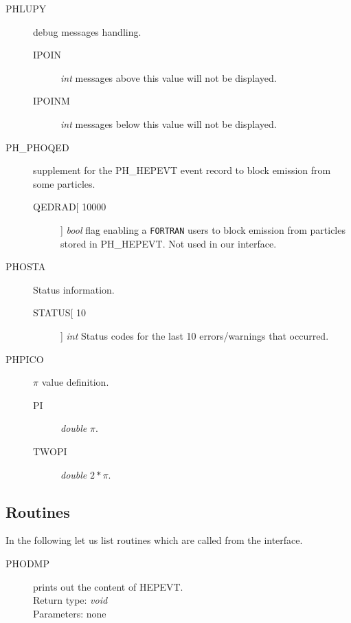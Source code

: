 \documentclass[]{Photos_interface_design}
\begin{document}
\begin{description}
\item[PHLUPY] debug messages handling.
    \begin{description}
    \item[IPOIN]  \textit{int} messages above this value will not be displayed.
	\item[IPOINM] \textit{int} messages below this value will not be displayed.
    \end{description}
\end{description}

\begin{description}
\item[PH\_PHOQED] supplement for the PH\_HEPEVT event record to block emission 
from some particles.
    \begin{description}
    \item[QEDRAD[ 10000]]  \textit{bool} flag enabling a {\tt FORTRAN} users
    to block emission from particles stored in PH\_HEPEVT. Not used in 
     our interface.
    \end{description}
\end{description}

\begin{description}
\item[PHOSTA] Status information.
    \begin{description}
    \item[STATUS[ 10]]  \textit{int} Status codes for the last 10 errors/warnings
    that occurred.
    \end{description}
\end{description}

\begin{description}
\item[PHPICO] $\pi$ value definition.
    \begin{description}
    \item[PI]  \textit{double} $\pi$.
	\item[TWOPI]  \textit{double} $2*\pi$.
    \end{description}
\end{description}

\subsection{Routines}

In the following let us list routines which are called from the interface.

\begin{description}
\item[PHODMP] prints out the content of HEPEVT. \\
  Return type: \textit{void} \\
  Parameters: none
\end{description}
\end{document}
